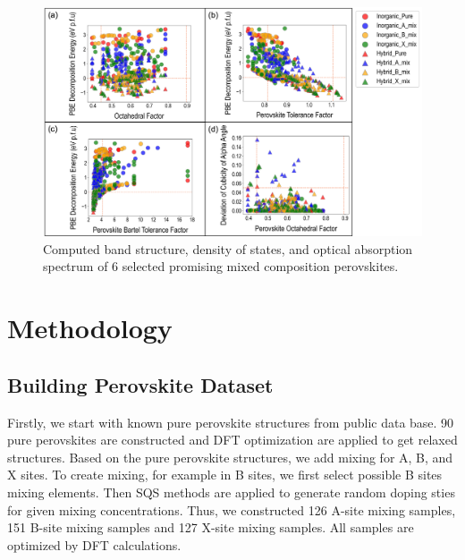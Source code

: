 \documentclass[twoside,twocolumn,9pt]{article}
\begin{document}
\begin{figure}[h]
\centering
\includegraphics[width=0.99\linewidth]{Figure6.png}
\caption{\label{Fig:outline} 
Computed band structure, density of states, and optical absorption spectrum of 6 selected promising mixed composition perovskites.}
\end{figure}


\newpage



\section*{Methodology}
\subsection*{Building Perovskite Dataset}
Firstly, we start with known pure perovskite structures from public data base. 90 pure perovskites are constructed and DFT optimization are applied to get relaxed structures. Based on the pure perovskite structures, we add mixing for A, B, and X sites. To create mixing, for example in B sites, we first select possible B sites mixing elements. Then SQS methods are applied to generate random doping sties for given mixing concentrations. Thus, we constructed 126 A-site mixing samples, 151 B-site mixing samples and 127 X-site mixing samples. All samples are optimized by DFT calculations.
\end{document}
